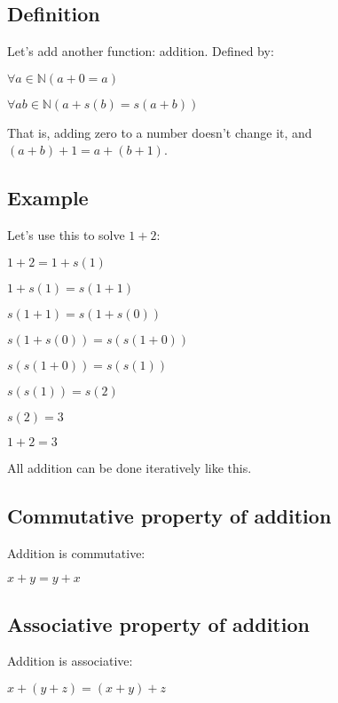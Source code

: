 
\subsection{Definition}
Let’s add another function: addition. Defined by:

\(\forall a \in \mathbb{N} (a+0=a)\)

\(\forall a b \in \mathbb{N} (a+s(b)=s(a+b))\)

That is, adding zero to a number doesn’t change it, and \((a+b)+1=a+(b+1)\).

\subsection{Example}

Let’s use this to solve \(1+2\):

\(1+2=1+s(1)\)

\(1+s(1)=s(1+1)\)

\(s(1+1)=s(1+s(0))\)

\(s(1+s(0))=s(s(1+0))\)

\(s(s(1+0))=s(s(1))\)

\(s(s(1))=s(2)\)

\(s(2)=3\)

\(1+2=3\)

All addition can be done iteratively like this.

\subsection{Commutative property of addition}

Addition is commutative:

\(x+y=y+x\)

\subsection{Associative property of addition}

Addition is associative:

\(x+(y+z)=(x+y)+z\)

